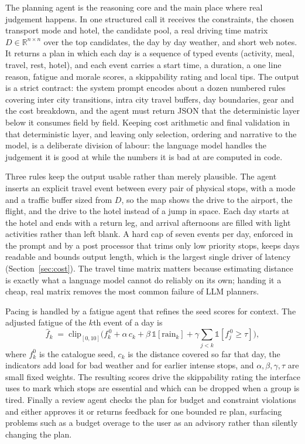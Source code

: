 \documentclass{ecai}
\begin{document}
The planning agent is the reasoning core and the main place where real judgement
happens. In one structured call it receives the constraints, the chosen
transport mode and hotel, the candidate pool, a real driving time matrix
$D\in\mathbb{R}^{n\times n}$ over the top candidates, the day by day weather,
and short web notes. It returns a plan in which each day is a sequence of typed
events (activity, meal, travel, rest, hotel), and each event carries a start
time, a duration, a one line reason, fatigue and morale scores, a skippability
rating and local tips. The output is a strict contract: the system prompt
encodes about a dozen numbered rules covering inter city transitions, intra
city travel buffers, day boundaries, gear and the cost breakdown, and the agent
must return JSON that the deterministic layer below it consumes field by field.
Keeping cost arithmetic and final validation in that deterministic layer, and
leaving only selection, ordering and narrative to the model, is a deliberate
division of labour: the language model handles the judgement it is good at while
the numbers it is bad at are computed in code.

Three rules keep the output usable rather than merely plausible. The agent
inserts an explicit travel event between every pair of physical stops, with a
mode and a traffic buffer sized from $D$, so the map shows the drive to the
airport, the flight, and the drive to the hotel instead of a jump in space.
Each day starts at the hotel and ends with a return leg, and arrival
afternoons are filled with light activities rather than left blank. A hard cap
of seven events per day, enforced in the prompt and by a post processor that
trims only low priority stops, keeps days readable and bounds output length,
which is the largest single driver of latency (Section~\ref{sec:cost}). The
travel time matrix matters because estimating distance is exactly what a
language model cannot do reliably on its own; handing it a cheap, real matrix
removes the most common failure of LLM planners.

Pacing is handled by a fatigue agent that refines the seed scores for context.
The adjusted fatigue of the $k$th event of a day is
%
\begin{equation}\label{eq:fatigue}
\hat{f}_k \;=\; \mathrm{clip}_{[0,10]}\!\Big( f^{\,0}_k
 + \alpha\, c_k + \beta\, \mathbb{1}[\text{rain}_k]
 + \gamma \!\!\sum_{j<k}\!\mathbb{1}[f^{\,0}_j \!\ge\! \tau] \Big),
\end{equation}
%
where $f^{0}_k$ is the catalogue seed, $c_k$ is the distance covered so far that
day, the indicators add load for bad weather and for earlier intense stops, and
$\alpha,\beta,\gamma,\tau$ are small fixed weights. The resulting scores drive
the skippability rating the interface uses to mark which stops are essential
and which can be dropped when a group is tired. Finally a review agent checks
the plan for budget and constraint violations and either approves it or returns
feedback for one bounded re plan, surfacing problems such as a budget overage
to the user as an advisory rather than silently changing the plan.
\end{document}
